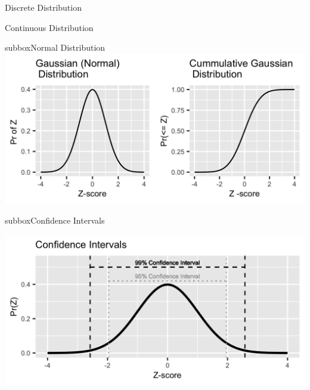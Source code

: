 \documentclass[10pt,a4paper]{article}
\begin{document}
\begin{multicols}{3}
\begin{textbox}{Discrete Distribution}
\end{textbox}
\begin{textbox}{Continuous Distribution}
\begin{subbox}{subbox}{Normal Distribution}
    \includegraphics[width=\textwidth]{Figures/Distributions/Normal.png}
\end{subbox}
\begin{subbox}{subbox}{Confidence Intervals}
\begin{center}
\tiny
    \includegraphics[width=\textwidth]{Figures/Distributions/CI_Normal.png}
\end{center}
\end{subbox}


\end{textbox}
\end{multicols}
\end{document}

